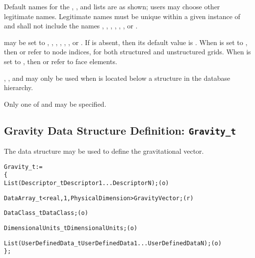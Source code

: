 \begin{notes}
\item Default names for the , ,
      and  lists are as shown; users may choose
      other legitimate names.
      Legitimate names must be unique within a given instance of
       and shall not include the names
      , , ,
      , , , or
      .
\item {} may be set to ,
      , , ,
      , , or .
      If  is absent, then its default value is
      .
      When  is set to , then
       or  refer to node indices, for
      both structured and unstructured grids.
      When  is set to , then
       or  refer to face elements.
\item {}, , and 
      may only be used when  is located below a
       structure in the database hierarchy.
\item Only one of  and  may be
      specified.
\end{notes}

\subsection{Gravity Data Structure Definition: \texttt{Gravity\_t}}
\label{s:Gravity}

The  data structure may be used to define the
gravitational vector.

\begin{alltt}
  Gravity\_t :=
    \{
    List( Descriptor\_t Descriptor1 ... DescriptorN ) ;                      (o)

    DataArray\_t<real, 1, PhysicalDimension> GravityVector ;                 (r)

    DataClass\_t DataClass ;                                                 (o)

    DimensionalUnits\_t DimensionalUnits ;                                   (o)

    List( UserDefinedData\_t UserDefinedData1 ... UserDefinedDataN ) ;       (o)
    \} ;
\end{alltt}

